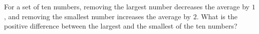 For a set of ten numbers, removing the largest number decreases the average by $1$, and removing the smallest number increases the average by $2$. What is the positive difference between the largest and the smallest of the ten numbers?

